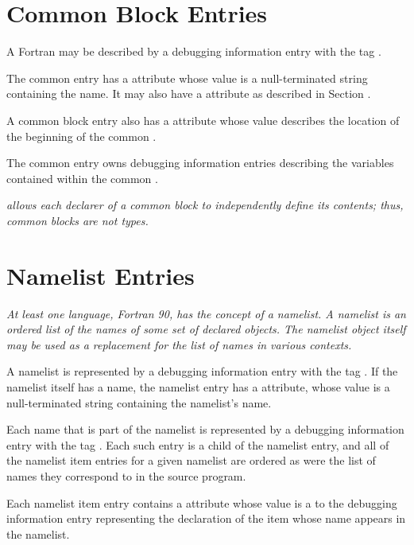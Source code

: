 \section{Common Block Entries}
\label{chap:commonblockentries}
A Fortran
may
be described by a debugging information entry with the
tag \DWTAGcommonblockTARG.

The common 
entry has a \DWATname{} attribute
whose value is a null-terminated string containing the
name. It may also have a \DWATlinkagename{} attribute as described
in Section .

A common block entry also has a \DWATlocation{} attribute
whose value describes the
location of the beginning of the common .

The common
 entry owns debugging information entries describing
the variables contained within the common .

\textit{ allows each declarer of a common block
to independently define its contents; thus, common blocks are not types.}

\section{Namelist Entries}
\label{chap:namelistentries}
\textit{At least one language, Fortran 90, has the concept of a
namelist. A namelist is an ordered list of the names of some
set of declared objects. The namelist object itself may be used
as a replacement for the list of names in various contexts.}

A namelist is represented by a debugging information entry
with the tag \DWTAGnamelistTARG.
If the namelist itself has a
name, the namelist entry has a \DWATname{} attribute,
whose value is a null-terminated
string containing the namelist\textquoteright{}s
name.

Each\hypertarget{chap:DWATnamelistitemnamelistitem}{}
name that is part of the namelist is represented
by a debugging information entry with the tag
\DWTAGnamelistitemTARG.
Each such entry is a child of the
namelist entry, and all of the
namelist item entries for a
given namelist are ordered as were the list of names they
correspond to in the source program.

Each namelist item entry contains a
\DWATnamelistitemDEFN{} attribute
whose
value is a  to the debugging
information entry representing the declaration of the item
whose name appears in the namelist.
